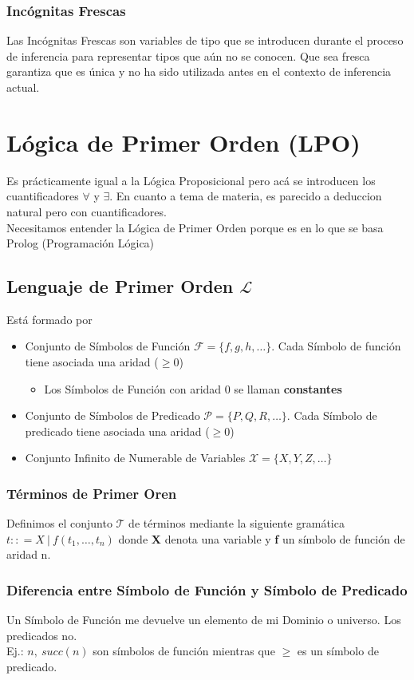 \documentclass[10pt,a4paper]{article}
\begin{document}
\subsubsection*{Incógnitas Frescas}
Las Incógnitas Frescas son variables de tipo que se introducen durante el proceso de inferencia para representar tipos que aún no se conocen. Que sea fresca garantiza que es única y no ha sido utilizada antes en el contexto de inferencia actual. 
\section*{Lógica de Primer Orden (LPO)}
Es prácticamente igual a la Lógica Proposicional pero acá se introducen los cuantificadores $\forall$ y $\exists$. En cuanto a tema de materia, es parecido a deduccion natural pero con cuantificadores. \\
Necesitamos entender la Lógica de Primer Orden porque es en lo que se basa Prolog (Programación Lógica) 
\subsection*{Lenguaje de Primer Orden $\mathcal{L}$}
Está formado por 
\begin{itemize}
    \item Conjunto de Símbolos de Función $\mathcal{F} = \{f, g, h, \dots\}$. Cada Símbolo de función tiene asociada una aridad ($\ge 0$)
    \begin{itemize}
        \item Los Símbolos de Función con aridad 0 se llaman \textbf{constantes}
    \end{itemize}
    \item Conjunto de Símbolos de Predicado $\mathcal{P} = \{P, Q, R, \dots\}$. Cada Símbolo de predicado tiene asociada una aridad ($\ge 0$)
    \item Conjunto Infinito de Numerable de Variables $ \mathcal{X} = \{X, Y, Z, \dots\}$
\end{itemize}
\subsubsection*{Términos de Primer Oren}
Definimos el conjunto $\mathcal{T}$ de términos mediante la siguiente gramática $t :: = X \ | \ f(t_{1}, \dots, t_{n})$ donde \textbf{X} denota una variable y \textbf{f} un símbolo de función de aridad n.
\subsubsection*{Diferencia entre Símbolo de Función y Símbolo de Predicado}
Un Símbolo de Función me devuelve un elemento de mi Dominio o universo. Los predicados no. \\
Ej.: $n, \ succ(n)$ son símbolos de función mientras que $\ge$ es un símbolo de predicado.
\end{document}
